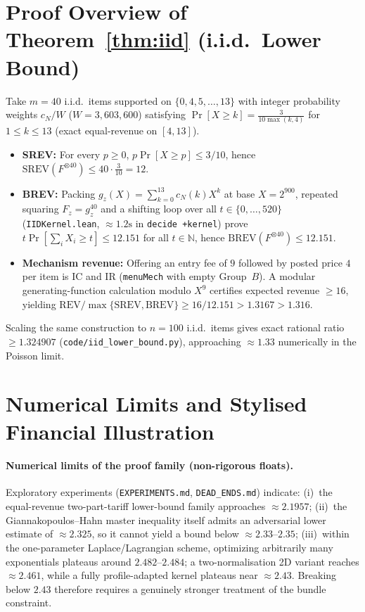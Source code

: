 \documentclass[11pt]{article}
\newcommand{\REV}{\mathrm{REV}}
\newcommand{\SREV}{\mathrm{SREV}}
\newcommand{\BREV}{\mathrm{BREV}}
\begin{document}
\section{Proof Overview of Theorem~\ref{thm:iid} (i.i.d.\ Lower Bound)}

Take $m = 40$ i.i.d.\ items supported on $\{0, 4, 5, \dots, 13\}$ with integer probability weights $c_N / W$ ($W = 3{,}603{,}600$) satisfying $\Pr[X \ge k] = \frac{3}{10\max(k, 4)}$ for $1 \le k \le 13$ (exact equal-revenue on $[4,13]$).
\begin{itemize}
  \item \textbf{SREV:} For every $p \ge 0$, $p \Pr[X \ge p] \le 3/10$, hence $\SREV(F^{\otimes 40}) \le 40 \cdot \frac{3}{10} = 12$.
  \item \textbf{BREV:} Packing $g_z(X) = \sum_{k=0}^{13} c_N(k) X^k$ at base $X = 2^{900}$, repeated squaring $F_z = g_z^{40}$ and a shifting loop over all $t \in \{0,\dots,520\}$ (\texttt{IIDKernel.lean}, $\approx 1.2\text{s}$ in \texttt{decide +kernel}) prove $t\Pr[\sum_i X_i \ge t] \le 12.151$ for all $t \in \mathbb{N}$, hence $\BREV(F^{\otimes 40}) \le 12.151$.
  \item \textbf{Mechanism revenue:} Offering an entry fee of $9$ followed by posted price $4$ per item is IC and IR (\texttt{menuMech} with empty Group~$B$). A modular generating-function calculation modulo $X^9$ certifies expected revenue $\ge 16$, yielding $\REV / \max\{\SREV, \BREV\} \ge 16 / 12.151 > 1.3167 > 1.316$.
\end{itemize}
Scaling the same construction to $n = 100$ i.i.d.\ items gives exact rational ratio $\ge 1.324907$ (\texttt{code/iid\_lower\_bound.py}), approaching $\approx 1.33$ numerically in the Poisson limit.

\section{Numerical Limits and Stylised Financial Illustration}

\paragraph{Numerical limits of the proof family (non-rigorous floats).}
Exploratory experiments (\texttt{EXPERIMENTS.md}, \texttt{DEAD\_ENDS.md}) indicate:
(i)~the equal-revenue two-part-tariff lower-bound family approaches $\approx 2.1957$;
(ii)~the Giannakopoulos--Hahn master inequality itself admits an adversarial lower estimate of $\approx 2.325$, so it cannot yield a bound below $\approx 2.33$--$2.35$;
(iii)~within the one-parameter Laplace/Lagrangian scheme, optimizing arbitrarily many exponentials plateaus around $2.482$--$2.484$; a two-normalisation 2D variant reaches $\approx 2.461$, while a fully profile-adapted kernel plateaus near $\approx 2.43$. Breaking below $2.43$ therefore requires a genuinely stronger treatment of the bundle constraint.
\end{document}
